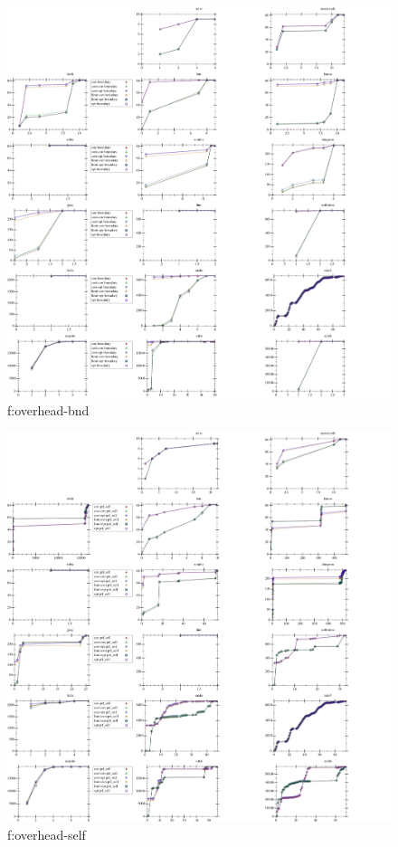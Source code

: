 \documentclass[acmsmall,review,anonymous]{acmart}
\begin{document}
\begin{figure}[t]
  \includegraphics[width=\textwidth]{data/cdf-overhead_boundary.pdf}
  \caption{f:overhead-bnd}
  \label{f:overhead-bnd}
\end{figure}

\begin{figure}[t]
  \includegraphics[width=\textwidth]{data/cdf-overhead_prf_self.pdf}
  \caption{f:overhead-self}
  \label{f:overhead-self}
\end{figure}
\end{document}
